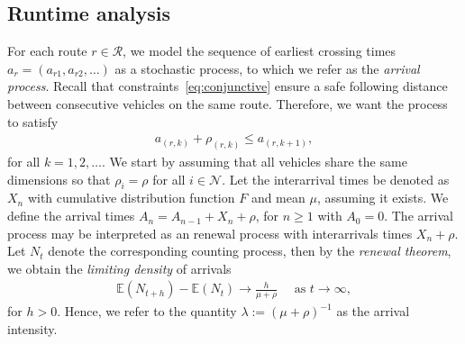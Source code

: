 \documentclass[a4paper]{article}
\theoremstyle{definition}
\theoremstyle{plain}
\begin{document}
\subsection{Runtime analysis}

For each route $r \in \mathcal{R}$, we model the sequence of earliest crossing times
$a_{r} = (a_{r1}, a_{r2}, \dots)$ as a stochastic process, to which we refer as
the \textit{arrival process}. Recall that constraints~\eqref{eq:conjunctive}
ensure a safe following distance between consecutive vehicles on the same route.
Therefore, we want the process to satisfy
\begin{align*}
  a_{(r, k)} + \rho_{(r,k)} \leq a_{(r, k + 1)} ,
\end{align*}
for all $k = 1, 2, \dots$. We start by assuming that all vehicles share the same
dimensions so that $\rho_{i} = \rho$ for all $i \in \mathcal{N}$.
%
Let the interarrival times be denoted as $X_{n}$ with cumulative distribution
function $F$ and mean $\mu$, assuming it exists. We define the arrival times
$A_{n} = A_{n-1} + X_{n} + \rho$, for $n \geq 1$ with $A_{0} = 0$.
%
The arrival process may be interpreted as an renewal process with interarrivals
times $X_{n} + \rho$.
%
%
Let $N_{t}$ denote the corresponding counting process, then by the \textit{renewal
  theorem}, we obtain the \textit{limiting density} of arrivals
%
\begin{align*}
  \mathbb{E}(N_{t + h}) - \mathbb{E}(N_{t}) \rightarrow \frac{h}{\mu + \rho} \quad \text{ as } t \rightarrow \infty ,
\end{align*}
for $h > 0$. Hence, we refer to the quantity $\lambda := {(\mu + \rho)}^{-1}$ as the
arrival intensity.

%
%
\end{document}
